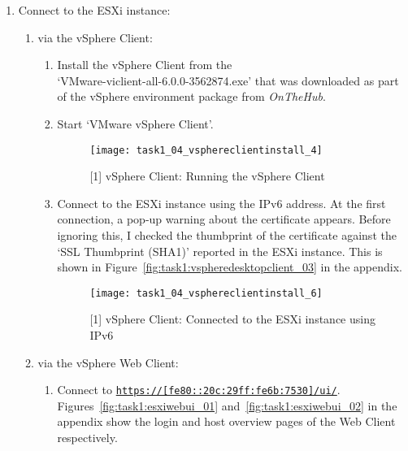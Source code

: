 \begin{enumerate}[resume*=task1methodology]
  \item Connect to the ESXi instance:
    \begin{enumerate}[label=(\alph*)]
      \item via the vSphere Client:
        \begin{enumerate}[label=\roman*.]
          \item Install the vSphere Client from the\\`VMware-viclient-all-6.0.0-3562874.exe' that was downloaded as part of the vSphere environment package from \textit{OnTheHub\textsuperscript{\textregistered}}.
          \item Start `VMware vSphere Client'.
            \begin{figure}[H]
              \centering
              \captionsetup{skip=2pt}
              \texttt{[image: task1\_04\_vsphereclientinstall\_4]}
              \caption{[1] vSphere Client: Running the vSphere Client}
              \label{fig:task1:vspheredesktopclient_02}
            \end{figure}
          \item Connect to the ESXi instance using the IPv6 address. At the first connection, a pop-up warning about the certificate appears. Before ignoring this, I checked the thumbprint of the certificate against the `SSL Thumbprint (SHA1)' reported in the ESXi instance. This is shown in Figure~\ref{fig:task1:vspheredesktopclient_03} in the  appendix.
            \begin{figure}[H]
              \centering
              \captionsetup{skip=2pt}
              \texttt{[image: task1\_04\_vsphereclientinstall\_6]}
              \caption{[1] vSphere Client: Connected to the ESXi instance using IPv6}
              \label{fig:task1:vspheredesktopclient_04}
            \end{figure}
        \end{enumerate}
      \item via the vSphere Web Client:
        \begin{enumerate}[label=\roman*.]
          \item Connect to \texttt{\url{https://[fe80::20c:29ff:fe6b:7530]/ui/}}. Figures~\ref{fig:task1:esxiwebui_01} and~\ref{fig:task1:esxiwebui_02} in the  appendix show the login and host overview pages of the Web Client respectively.
        \end{enumerate}
    \end{enumerate}
\end{enumerate}

